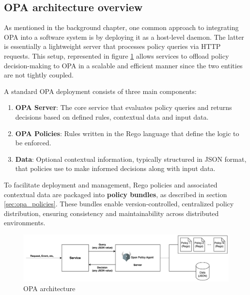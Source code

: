 \subsection{OPA architecture overview}

As mentioned in the background chapter, one common approach to integrating OPA into a software system is by deploying it as a host-level daemon. 
The latter is essentially a lightweight server that processes policy queries via HTTP requests. 
This setup, represented in figure \ref{fig:opa_architecture} allows services to offload policy decision-making to OPA in a scalable and efficient manner since the two entities are not tightly coupled.

A standard OPA deployment consists of three main components:

\begin{enumerate}[itemsep=0.2pt, topsep=1pt]
  \item \textbf{OPA Server}: The core service that evaluates policy queries and returns decisions based on defined rules, contextual data and input data.
  \item \textbf{OPA Policies}: Rules written in the Rego language that define the logic to be enforced.
  \item \textbf{Data}: Optional contextual information, typically structured in JSON format, that policies use to make informed decisions along with input data.
\end{enumerate}

To facilitate deployment and management, Rego policies and associated contextual data are packaged into \textbf{policy bundles}, as described in section \ref{sec:opa_policies}. These bundles enable version-controlled, centralized policy distribution, ensuring consistency and maintainability across distributed environments. \newline

\begin{figure}[t]
\centering
\includegraphics[width=1\linewidth]{images/OPA.png}
\caption{OPA architecture}
\label{fig:opa_architecture}
\end{figure}


